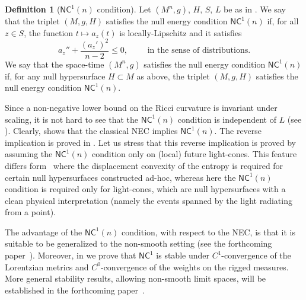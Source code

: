 \documentclass[12pt,a4paper]{amsart}
\theoremstyle{plain}
\theoremstyle{definition}
\newtheorem{definition}[lemma]{Definition}
\numberwithin{equation}{section}
\newcommand{\NC}{\mathsf{NC}}
\begin{document}
\begin{definition}[$\NC^{1}(n)$ condition]\label{def:NC1QuadruplesIntro}
  Let $(M^n,g)$, $H,\, S,\, L$ be as in . We say that the triplet $(M,g,H)$ satisfies the null energy condition $\NC^1(n)$ if, for all $z\in S$, the function
$t\mapsto a_z(t)$ is locally-Lipschitz and it  satisfies
\begin{equation}
  a_z''
  +
  \frac{(a_z')^2}{n-2}
  \leq 0
  ,
  \qquad
  \text{ in the sense of distributions}.
\end{equation}
  We say that the space-time $(M^n,g)$ satisfies the
   null energy condition $\NC^1(n)$ if, for
  any null hypersurface $H\subset M$ as above, the triplet $(M,g,H)$ satisfies the null
  energy condition $\NC^1(n)$.
\end{definition}
Since a non-negative lower bound on the  Ricci curvature is invariant under scaling, it is not hard to see that the $\NC^1(n)$ condition is independent of $L$ (see ). Clearly,  shows that the classical NEC implies $\NC^1(n)$. The reverse implication is proved in . 
Let us stress that this reverse implication is proved by assuming the $\NC^1(n)$ condition only on (local) future light-cones.
%
This feature differs form~\cite{Ket24} where the displacement
convexity of the entropy is required for certain null hypersurfaces
constructed ad-hoc, whereas here the $\NC^1(n)$ condition is required
only for light-cones, which are null hypersurfaces with a clean
physical interpretation (namely the events spanned by the light radiating from a point).


The advantage of the $\NC^1(n)$ condition, with respect to the NEC, is that it is suitable to be generalized to the non-smooth setting (see the forthcoming paper~\cite{CMM24b}). Moreover, in  we prove that $\NC^1$ is stable under $C^1$-convergence of the Lorentzian metrics and $C^0$-convergence of the weights on the rigged measures. More general stability results, allowing non-smooth limit spaces, will be established in the forthcoming paper~\cite{CMM24b}. 
\end{document}
